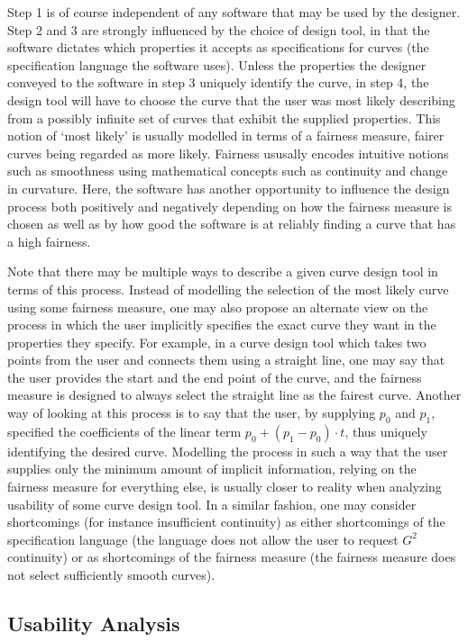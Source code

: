 \documentclass[a4paper]{article}
\begin{document}
			Step 1 is of course independent of any software that may be used by the designer. Step 2 and 3 are strongly influenced by the choice of design tool, in that the software dictates which properties it accepts as specifications for curves (the specification language the software uses). Unless the properties the designer conveyed to the software in step 3 uniquely identify the curve, in step 4, the design tool will have to choose the curve that the user was most likely describing from a possibly infinite set of curves that exhibit the supplied properties. This notion of `most likely' is usually modelled in terms of a fairness measure, fairer curves being regarded as more likely. Fairness ususally encodes intuitive notions such as smoothness using mathematical concepts such as continuity and change in curvature. Here, the software has another opportunity to influence the design process both positively and negatively depending on how the fairness measure is chosen as well as by how good the software is at reliably finding a curve that has a high fairness.

			Note that there may be multiple ways to describe a given curve design tool in terms of this process. Instead of modelling the selection of the most likely curve using some fairness measure, one may also propose an alternate view on the process in which the user implicitly specifies the exact curve they want in the properties they specify. For example, in a curve design tool which takes two points from the user and connects them using a straight line, one may say that the user provides the start and the end point of the curve, and the fairness measure is designed to always select the straight line as the fairest curve. Another way of looking at this process is to say that the user, by supplying \(p_0\) and \(p_1\), specified the coefficients of the linear term \(p_0 + (p_1 - p_0) \cdot t\), thus uniquely identifying the desired curve. Modelling the process in such a way that the user supplies only the minimum amount of implicit information, relying on the fairness measure for everything else, is usually closer to reality when analyzing usability of some curve design tool. In a similar fashion, one may consider shortcomings (for instance insufficient continuity) as either shortcomings of the specification language (the language does not allow the user to request \(G^2\) continuity) or as shortcomings of the fairness measure (the fairness measure does not select sufficiently smooth curves).

		\subsection{Usability Analysis}
		\label{section:usability_analysis}
\end{document}

